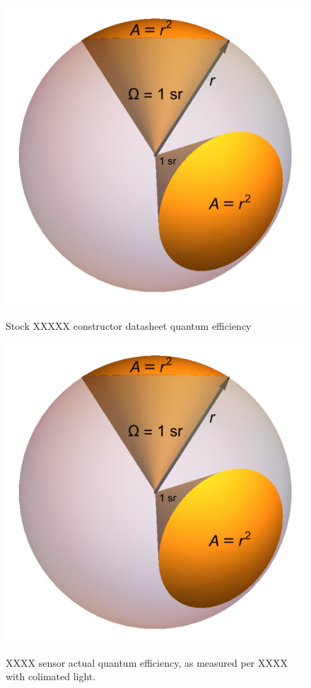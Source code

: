 \documentclass{article}
\begin{document}
      \begin{figure}[h!]
	\includegraphics[width=1.0\textwidth]{../../figures/Solid_Angle_1_Steradian.png}\\
	\caption{Stock XXXXX constructor datasheet quantum efficiency}
	\label{fig:stock_xxx_qe}
      \end{figure}
      \begin{figure}[h!]
	\includegraphics[width=1.0\textwidth]{../../figures/Solid_Angle_1_Steradian.png}\\
	\caption{XXXX sensor actual quantum efficiency, as measured per XXXX with colimated light.}
	\label{fig:reference_to_qe_sensor}
      \end{figure}
\end{document}
